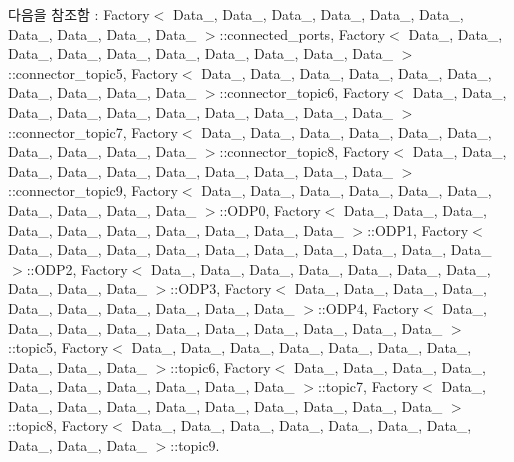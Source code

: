 다음을 참조함 \+:  Factory$<$ Data\+\_, Data\+\_, Data\+\_, Data\+\_, Data\+\_, Data\+\_, Data\+\_, Data\+\_, Data\+\_, Data\+\_ $>$\+::connected\+\_\+ports, Factory$<$ Data\+\_, Data\+\_, Data\+\_, Data\+\_, Data\+\_, Data\+\_, Data\+\_, Data\+\_, Data\+\_, Data\+\_ $>$\+::connector\+\_\+topic5, Factory$<$ Data\+\_, Data\+\_, Data\+\_, Data\+\_, Data\+\_, Data\+\_, Data\+\_, Data\+\_, Data\+\_, Data\+\_ $>$\+::connector\+\_\+topic6, Factory$<$ Data\+\_, Data\+\_, Data\+\_, Data\+\_, Data\+\_, Data\+\_, Data\+\_, Data\+\_, Data\+\_, Data\+\_ $>$\+::connector\+\_\+topic7, Factory$<$ Data\+\_, Data\+\_, Data\+\_, Data\+\_, Data\+\_, Data\+\_, Data\+\_, Data\+\_, Data\+\_, Data\+\_ $>$\+::connector\+\_\+topic8, Factory$<$ Data\+\_, Data\+\_, Data\+\_, Data\+\_, Data\+\_, Data\+\_, Data\+\_, Data\+\_, Data\+\_, Data\+\_ $>$\+::connector\+\_\+topic9, Factory$<$ Data\+\_, Data\+\_, Data\+\_, Data\+\_, Data\+\_, Data\+\_, Data\+\_, Data\+\_, Data\+\_, Data\+\_ $>$\+::\+O\+D\+P0, Factory$<$ Data\+\_, Data\+\_, Data\+\_, Data\+\_, Data\+\_, Data\+\_, Data\+\_, Data\+\_, Data\+\_, Data\+\_ $>$\+::\+O\+D\+P1, Factory$<$ Data\+\_, Data\+\_, Data\+\_, Data\+\_, Data\+\_, Data\+\_, Data\+\_, Data\+\_, Data\+\_, Data\+\_ $>$\+::\+O\+D\+P2, Factory$<$ Data\+\_, Data\+\_, Data\+\_, Data\+\_, Data\+\_, Data\+\_, Data\+\_, Data\+\_, Data\+\_, Data\+\_ $>$\+::\+O\+D\+P3, Factory$<$ Data\+\_, Data\+\_, Data\+\_, Data\+\_, Data\+\_, Data\+\_, Data\+\_, Data\+\_, Data\+\_, Data\+\_ $>$\+::\+O\+D\+P4, Factory$<$ Data\+\_, Data\+\_, Data\+\_, Data\+\_, Data\+\_, Data\+\_, Data\+\_, Data\+\_, Data\+\_, Data\+\_ $>$\+::topic5, Factory$<$ Data\+\_, Data\+\_, Data\+\_, Data\+\_, Data\+\_, Data\+\_, Data\+\_, Data\+\_, Data\+\_, Data\+\_ $>$\+::topic6, Factory$<$ Data\+\_, Data\+\_, Data\+\_, Data\+\_, Data\+\_, Data\+\_, Data\+\_, Data\+\_, Data\+\_, Data\+\_ $>$\+::topic7, Factory$<$ Data\+\_, Data\+\_, Data\+\_, Data\+\_, Data\+\_, Data\+\_, Data\+\_, Data\+\_, Data\+\_, Data\+\_ $>$\+::topic8, Factory$<$ Data\+\_, Data\+\_, Data\+\_, Data\+\_, Data\+\_, Data\+\_, Data\+\_, Data\+\_, Data\+\_, Data\+\_ $>$\+::topic9.



